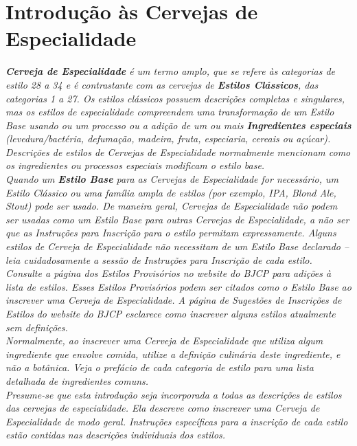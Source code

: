 \section*{Introdução às Cervejas de Especialidade}
\textit{\textbf{Cerveja de Especialidade} é um termo amplo, que se refere às categorias de estilo 28 a 34 e é contrastante com as cervejas de \textbf{Estilos Clássicos}, das categorias 1 a 27. Os estilos clássicos possuem descrições completas e singulares, mas os estilos de especialidade compreendem uma transformação de um Estilo Base usando ou um processo ou a adição de um ou mais \textbf{Ingredientes especiais} (levedura/bactéria, defumação, madeira, fruta, especiaria, cereais ou açúcar). Descrições de estilos de Cervejas de Especialidade normalmente mencionam como os ingredientes ou processos especiais modificam o estilo base.}\\
\textit{Quando um \textbf{Estilo Base} para as Cervejas de Especialidade for necessário, um Estilo Clássico ou uma família ampla de estilos (por exemplo, IPA, Blond Ale, Stout) pode ser usado. De maneira geral, Cervejas de Especialidade não podem ser usadas como um Estilo Base para outras Cervejas de Especialidade, a não ser que as Instruções para Inscrição para o estilo permitam expressamente. Alguns estilos de Cerveja de Especialidade não necessitam de um Estilo Base declarado – leia cuidadosamente a sessão de Instruções para Inscrição de cada estilo.}\\
\textit{Consulte a página dos Estilos Provisórios no website do BJCP para adições à lista de estilos. Esses Estilos Provisórios podem ser citados como o Estilo Base ao inscrever uma Cerveja de Especialidade. A página de Sugestões de Inscrições de Estilos do website do BJCP esclarece como inscrever alguns estilos atualmente sem definições.}\\
\textit{Normalmente, ao inscrever uma Cerveja de Especialidade que utiliza algum ingrediente que envolve comida, utilize a definição culinária deste ingrediente, e não a botânica. Veja o prefácio de cada categoria de estilo para uma lista detalhada de ingredientes comuns. }\\
\textit{Presume-se que esta introdução seja incorporada a todas as descrições de estilos das cervejas de especialidade. Ela descreve como inscrever uma Cerveja de Especialidade de modo geral. Instruções específicas para a inscrição de cada estilo estão contidas nas descrições individuais dos estilos.}\\
